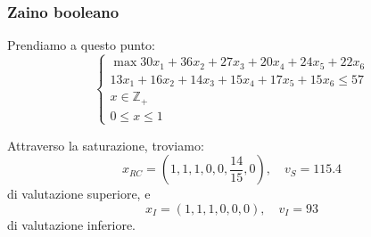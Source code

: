 \documentclass[a4paper,11pt]{article}
\begin{document}
\subsubsection{Zaino booleano}
Prendiamo a questo punto:
\[
	\begin{cases}
		\max 30 x_1 + 36 x_2 + 27 x_3 + 20 x_4 + 24 x_5 + 22 x_6 \\ 
		13 x_1 + 16 x_2 + 14 x_3 + 15 x_4 +17 x_5 + 15 x_6 \leq 57 \\ 
		x \in \mathbb{Z}_+ \\
		0 \leq x \leq 1
	\end{cases}
\]

Attraverso la saturazione, troviamo:
$$
x_{RC} = \left( 1, 1, 1, 0, 0, \frac{14}{15}, 0 \right), \quad v_S = 115.4
$$
di valutazione superiore, e 
$$x_I = (1, 1, 1, 0, 0, 0), \quad v_I = 93 $$
di valutazione inferiore.
\end{document}

